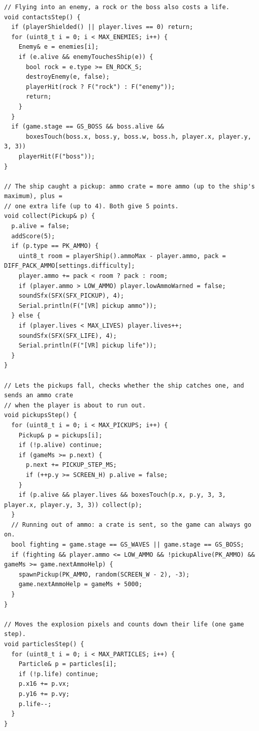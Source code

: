 \documentclass[11pt,a4paper]{article}
\begin{document}
\begin{latin}
\begin{lstlisting}[language=Arduino]
// Flying into an enemy, a rock or the boss also costs a life.
void contactsStep() {
  if (playerShielded() || player.lives == 0) return;
  for (uint8_t i = 0; i < MAX_ENEMIES; i++) {
    Enemy& e = enemies[i];
    if (e.alive && enemyTouchesShip(e)) {
      bool rock = e.type >= EN_ROCK_S;
      destroyEnemy(e, false);
      playerHit(rock ? F("rock") : F("enemy"));
      return;
    }
  }
  if (game.stage == GS_BOSS && boss.alive &&
      boxesTouch(boss.x, boss.y, boss.w, boss.h, player.x, player.y, 3, 3))
    playerHit(F("boss"));
}

// The ship caught a pickup: ammo crate = more ammo (up to the ship's maximum), plus =
// one extra life (up to 4). Both give 5 points.
void collect(Pickup& p) {
  p.alive = false;
  addScore(5);
  if (p.type == PK_AMMO) {
    uint8_t room = playerShip().ammoMax - player.ammo, pack = DIFF_PACK_AMMO[settings.difficulty];
    player.ammo += pack < room ? pack : room;
    if (player.ammo > LOW_AMMO) player.lowAmmoWarned = false;
    soundSfx(SFX(SFX_PICKUP), 4);
    Serial.println(F("[VR] pickup ammo"));
  } else {
    if (player.lives < MAX_LIVES) player.lives++;
    soundSfx(SFX(SFX_LIFE), 4);
    Serial.println(F("[VR] pickup life"));
  }
}

// Lets the pickups fall, checks whether the ship catches one, and sends an ammo crate
// when the player is about to run out.
void pickupsStep() {
  for (uint8_t i = 0; i < MAX_PICKUPS; i++) {
    Pickup& p = pickups[i];
    if (!p.alive) continue;
    if (gameMs >= p.next) {
      p.next += PICKUP_STEP_MS;
      if (++p.y >= SCREEN_H) p.alive = false;
    }
    if (p.alive && player.lives && boxesTouch(p.x, p.y, 3, 3, player.x, player.y, 3, 3)) collect(p);
  }
  // Running out of ammo: a crate is sent, so the game can always go on.
  bool fighting = game.stage == GS_WAVES || game.stage == GS_BOSS;
  if (fighting && player.ammo <= LOW_AMMO && !pickupAlive(PK_AMMO) && gameMs >= game.nextAmmoHelp) {
    spawnPickup(PK_AMMO, random(SCREEN_W - 2), -3);
    game.nextAmmoHelp = gameMs + 5000;
  }
}

// Moves the explosion pixels and counts down their life (one game step).
void particlesStep() {
  for (uint8_t i = 0; i < MAX_PARTICLES; i++) {
    Particle& p = particles[i];
    if (!p.life) continue;
    p.x16 += p.vx;
    p.y16 += p.vy;
    p.life--;
  }
}


\end{lstlisting}
\end{latin}
\end{document}
